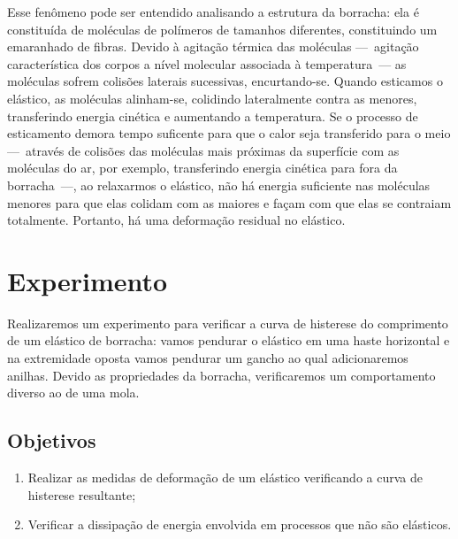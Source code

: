 Esse fenômeno pode ser entendido analisando a estrutura da borracha: ela é constituída de moléculas de polímeros de tamanhos diferentes, constituindo um emaranhado de fibras. Devido à agitação térmica das moléculas ---~agitação característica dos corpos a nível molecular associada à temperatura~--- as moléculas sofrem colisões laterais sucessivas, encurtando-se. Quando esticamos o elástico, as moléculas alinham-se, colidindo lateralmente contra as menores, transferindo energia cinética e aumentando a temperatura. Se o processo de esticamento demora tempo suficente para que o calor seja transferido para o meio ---~através de colisões das moléculas mais próximas da superfície com as moléculas do ar, por exemplo, transferindo energia cinética para fora da borracha~---, ao relaxarmos o elástico, não há energia suficiente nas moléculas menores para que elas colidam com as maiores e façam com que elas se contraiam totalmente. Portanto, há uma deformação residual no elástico.

\section{Experimento}

Realizaremos um experimento para verificar a curva de histerese do comprimento de um elástico de borracha: vamos pendurar o elástico em uma haste horizontal e na extremidade oposta vamos pendurar um gancho ao qual adicionaremos anilhas. Devido as propriedades da borracha, verificaremos um comportamento diverso ao de uma mola.

\subsection{Objetivos}
\label{Sec:ObjetivosElasticidade}

\begin{enumerate}
	\item Realizar as medidas de deformação de um elástico verificando a curva de histerese resultante;
	\item Verificar a dissipação de energia envolvida em processos que não são elásticos. 
\end{enumerate}

